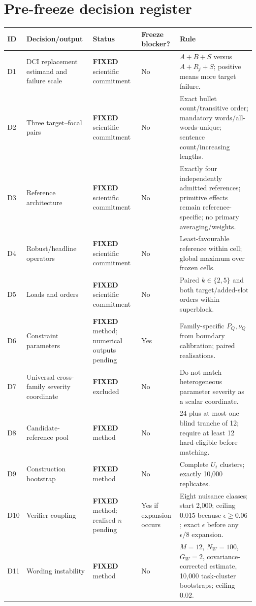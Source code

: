 \documentclass[11pt,a4paper]{article}
\newcommand{\FIXED}{\textbf{FIXED}}
\begin{document}
\section{Pre-freeze decision register}\label{sec:register}
\small
\begin{longtable}{p{}p{}p{}p{}p{}}
\toprule
\textbf{ID} & \textbf{Decision/output} & \textbf{Status} & \textbf{Freeze blocker?} & \textbf{Rule} \\
\midrule
\endhead
D1 & DCI replacement estimand and failure scale & \FIXED{} scientific commitment & No & $A+B+S$ versus $A+R_j+S$; positive means more target failure. \\
D2 & Three target--focal pairs & \FIXED{} scientific commitment & No & Exact bullet count/transitive order; mandatory words/all-words-unique; sentence count/increasing lengths. \\
D3 & Reference architecture & \FIXED{} scientific commitment & No & Exactly four independently admitted references; primitive effects remain reference-specific; no primary averaging/weights. \\
D4 & Robust/headline operators & \FIXED{} scientific commitment & No & Least-favourable reference within cell; global maximum over frozen cells. \\
D5 & Loads and orders & \FIXED{} scientific commitment & No & Paired $k\in\{2,5\}$ and both target/added-slot orders within superblock. \\
D6 & Constraint parameters & \FIXED{} method; numerical outputs pending & Yes & Family-specific $P_Q,\nu_Q$ from boundary calibration; paired realisations. \\
D7 & Universal cross-family severity coordinate & \FIXED{} excluded & No & Do not match heterogeneous parameter severity as a scalar coordinate. \\
D8 & Candidate-reference pool & \FIXED{} method & No & 24 plus at most one blind tranche of 12; require at least 12 hard-eligible before matching. \\
D9 & Construction bootstrap & \FIXED{} method & No & Complete $U_i$ clusters; exactly 10,000 replicates. \\
D10 & Verifier coupling & \FIXED{} method; realised $n$ pending & Yes if expansion occurs & Eight nuisance classes; start 2,000; ceiling $0.015$ because $\epsilon\ge0.06$; exact $\epsilon$ before any $\epsilon/8$ expansion. \\
D11 & Wording instability & \FIXED{} method & No & $M=12$, $N_W=100$, $G_W=2$, covariance-corrected estimate, 10,000 task-cluster bootstraps; ceiling $0.02$. \\

\end{longtable}
\end{document}
